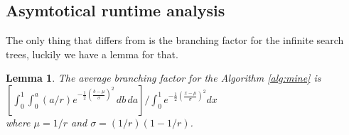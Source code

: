\documentclass{article}
\newtheorem{lemma}[theorem]{Lemma}
\begin{document}
\subsection{Asymtotical runtime analysis}
The only thing that differs from \cite{parvini} is the branching factor for the infinite search trees, luckily we have a lemma for that.

\begin{lemma}
The average branching factor for the Algorithm \ref{alg:mine} is \\
  $[ \int_0^1 \int_0^{a} (a/r) e^{-\frac{1}{2}(\frac{b - \mu}{\sigma})^2} \,db\,da ] / \int_0^1 e^{-\frac{1}{2}(\frac{x - \mu}{\sigma})^2} dx$ \\
  where $\mu = 1/r$ and $\sigma = (1/r)(1 - 1/r)$.
\end{lemma}
\end{document}
